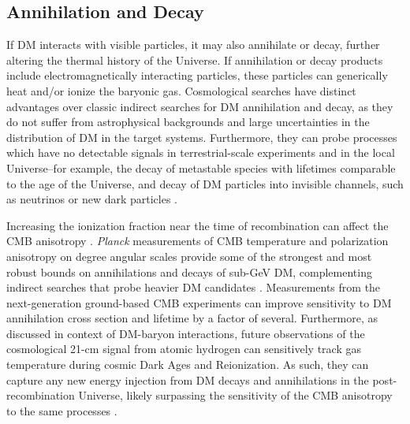 \documentclass[12pt]{article}
\begin{document}
\vspace{-0.3cm}
\subsection{Annihilation and Decay}

If DM interacts with visible particles, it may also annihilate or decay, further altering the thermal history of the Universe. 
If annihilation or decay products include electromagnetically interacting particles, these particles can generically heat and/or ionize the baryonic gas.
Cosmological searches have distinct advantages over classic indirect searches for DM annihilation and decay, as they do not suffer from astrophysical backgrounds and large uncertainties in the distribution of DM in the target systems.
Furthermore, they can probe processes which have no detectable signals in terrestrial-scale experiments and in the local Universe--for example, the decay of metastable species with lifetimes comparable to the age of the Universe, and decay of DM particles into invisible channels, such as neutrinos or new dark particles \cite{Poulin:2016nat,Poulin:2016anj}. 

Increasing the ionization fraction near the time of recombination can affect the CMB anisotropy \cite{Adams:1998nr,Chen:2003gz, Padmanabhan:2005es}. 
\textit{Planck} measurements of CMB temperature and polarization anisotropy on degree angular scales provide some of the strongest and most robust bounds on annihilations and decays of sub-GeV DM, complementing indirect searches that probe heavier DM candidates \cite{Aghanim:2018eyx,Slatyer:2016qyl}. 
Measurements from the next-generation ground-based CMB experiments can improve sensitivity to DM annihilation cross section and lifetime by a factor of several.
Furthermore, as discussed in context of DM-baryon interactions, future observations of the cosmological 21-cm signal from atomic hydrogen can sensitively track gas temperature during cosmic Dark Ages and Reionization.
As such, they can capture any new energy injection from DM decays and annihilations in the post-recombination Universe, likely surpassing the sensitivity of the CMB anisotropy to the same processes \cite{Furlanetto:2006wp,Valdes:2007cu,Evoli:2014pva,Lopez-Honorez:2016sur,Poulin:2016anj}. 
\end{document}
